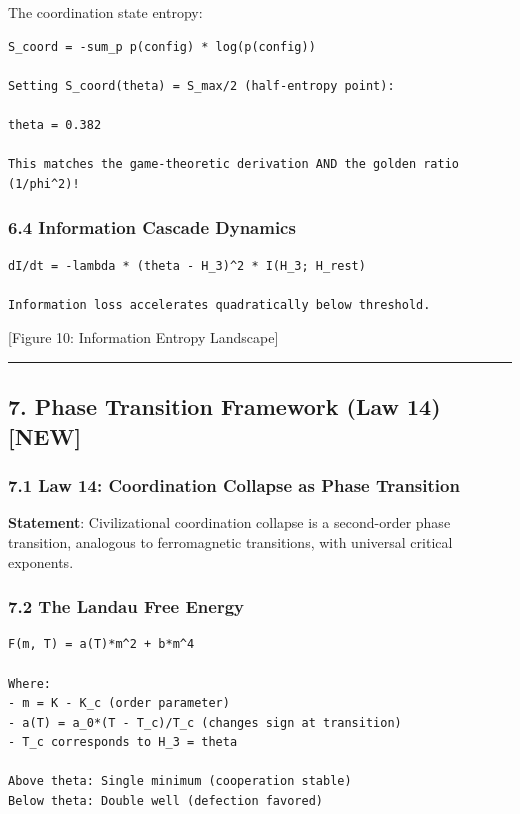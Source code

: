 \documentclass[11pt,letterpaper]{article}
\begin{document}
The coordination state entropy:

\begin{verbatim}
S_coord = -sum_p p(config) * log(p(config))

Setting S_coord(theta) = S_max/2 (half-entropy point):

theta = 0.382

This matches the game-theoretic derivation AND the golden ratio (1/phi^2)!
\end{verbatim}

\subsubsection{6.4 Information Cascade
Dynamics}\label{information-cascade-dynamics}

\begin{verbatim}
dI/dt = -lambda * (theta - H_3)^2 * I(H_3; H_rest)

Information loss accelerates quadratically below threshold.
\end{verbatim}

{[}Figure 10: Information Entropy Landscape{]}

\begin{center}\rule{0.5\linewidth}{0.5pt}\end{center}

\subsection{7. Phase Transition Framework (Law 14)
{[}NEW{]}}\label{phase-transition-framework-law-14-new}

\subsubsection{7.1 Law 14: Coordination Collapse as Phase
Transition}\label{law-14-coordination-collapse-as-phase-transition}

\textbf{Statement}: Civilizational coordination collapse is a
second-order phase transition, analogous to ferromagnetic transitions,
with universal critical exponents.

\subsubsection{7.2 The Landau Free Energy}\label{the-landau-free-energy}

\begin{verbatim}
F(m, T) = a(T)*m^2 + b*m^4

Where:
- m = K - K_c (order parameter)
- a(T) = a_0*(T - T_c)/T_c (changes sign at transition)
- T_c corresponds to H_3 = theta

Above theta: Single minimum (cooperation stable)
Below theta: Double well (defection favored)
\end{verbatim}
\end{document}
